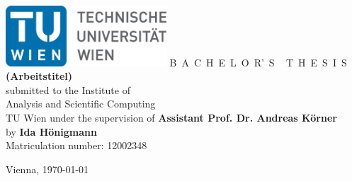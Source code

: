 \documentclass[a4paper,11pt,bibliography=totoc,listof=totoc,headinclude=true,cleardoublepage=empty]{scrbook}
\begin{document}

\begin{titlepage}
	\begin{center}
		\includegraphics[width=0.45\textwidth]{fig/TULogo.eps}
		\vskip 1cm
		{\LARGE B~\Large A~C~H~E~L~O~R'~S ~ \LARGE T~\Large H~E~S~I~S}
		\vskip 8mm
		{\huge\bfseries
			(Arbeitstitel) \\ [1ex]}
		\vskip 1cm
		\large 
		submitted to the    
		\vskip 0.75cm
		{\Large Institute of\\[1ex] Analysis and Scientific Computing}\\[1ex]
		{\Large TU Wien}
		\vskip0.75cm
		under the supervision of
		\vskip0.75cm
		{\Large\bfseries Assistant Prof. Dr. Andreas Körner}\\
		\vskip0.75cm
		by
		\vskip 0.75cm
		{\Large\bfseries Ida Hönigmann}\\[1ex]
		{Matriculation number: 12002348}\\[1ex]
	\end{center}
	
	\vfill
	
	\small
	Vienna, \today 
	\vspace*{-15mm}
\end{titlepage}

\end{document}
